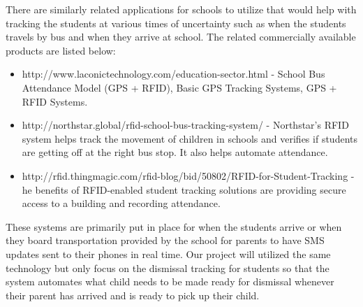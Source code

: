 \quad \quad There are similarly related applications for schools to utilize that would 
help with tracking the students at various times of uncertainty such as when the 
students travels by bus and when they arrive at school.
The related commercially available products are listed below:
\begin{itemize}
	\item http://www.laconictechnology.com/education-sector.html - School Bus 
	Attendance Model (GPS + RFID), Basic GPS Tracking Systems, GPS + RFID Systems.
	\item http://northstar.global/rfid-school-bus-tracking-system/ - Northstar's RFID 
	system helps track the movement of children in schools and verifies if students 
	are getting off at the right bus stop. It also helps automate attendance.
	\item http://rfid.thingmagic.com/rfid-blog/bid/50802/RFID-for-Student-Tracking - 
	he benefits of RFID-enabled student tracking solutions are providing secure access 
	to a building and recording attendance.
\end{itemize}
\quad \quad These systems are primarily put in place for when the students arrive or 
when they board transportation provided by the school for parents to have SMS updates 
sent to their phones in real time. Our project will utilized the same technology but 
only focus on the dismissal tracking for students so that the system automates what 
child needs to be made ready for dismissal whenever their parent has arrived and is 
ready to pick up their child. 